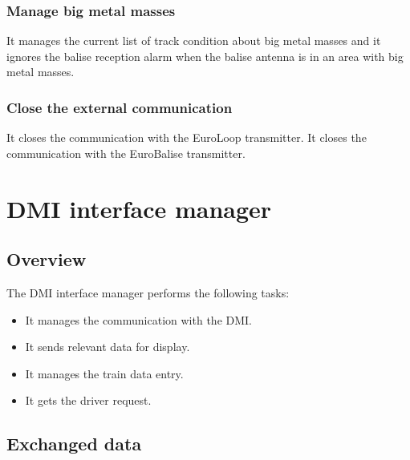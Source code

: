 \documentclass[nocc]{template/openetcs_report}
\begin{document}
\subsection{Manage big metal masses}
It manages the current list of track condition about big metal masses and it ignores the balise reception alarm when the balise antenna is in an area with big metal masses.

\subsection{Close the external communication}
It closes the communication with the EuroLoop transmitter.
It closes the communication with the EuroBalise transmitter.

\chapter{DMI interface manager}
\section{Overview}
The DMI interface manager performs the following tasks:
\begin{itemize}
\item It manages the communication with the DMI.
\item It sends relevant data for display.
\item It manages the train data entry.
\item It gets the driver request.
\end{itemize}
\section{Exchanged data}
\end{document}
